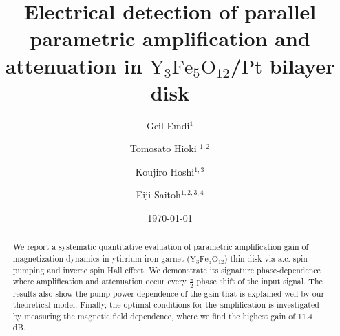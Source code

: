 \documentclass[%
 reprint,
 amsmath,amssymb,
 aps,
prb,
]{revtex4-2}
\begin{document}

\title{Electrical detection of parallel parametric amplification and attenuation in $\mathrm{Y}_3\mathrm{Fe}_5\mathrm{O}_{12}$/$\mathrm{Pt}$ bilayer disk}

\author{Geil Emdi$^{1}$}
\author{Tomosato Hioki $^{1,2}$ }
\author{Koujiro Hoshi$^{1,3}$}
\author{Eiji Saitoh$^{1,2,3,4}$}
 





\date{\today}%

\begin{abstract}
We report a systematic quantitative evaluation of parametric amplification gain of magnetization dynamics in ytirrium iron garnet ($\mathrm{Y}_3\mathrm{Fe}_5\mathrm{O}_{12}$) thin disk via a.c. spin pumping and inverse spin Hall effect. We demonstrate its signature phase-dependence where amplification and attenuation occur every $\frac{\pi}{2}$ phase shift of the input signal. The results also show the pump-power dependence of the gain that is explained well by our theoretical model. Finally, the optimal conditions for the amplification is investigated by measuring the magnetic field dependence, where we find the highest gain of 11.4 dB.
\end{abstract}

\maketitle
\end{document}
